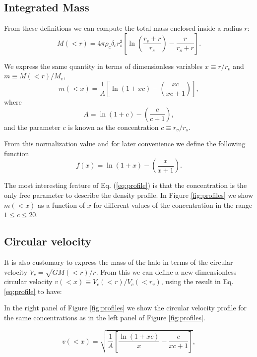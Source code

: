 \documentclass{emulateapj}
\begin{document}
\subsection{Integrated Mass}
From these definitions we can compute the total mass enclosed inside a
radius $r$:
\begin{equation}
M(<r) = 4\pi\rho_c\delta_c  r_s^3\left[\ln \left
  (\frac{r_s+r}{r_s}\right) - \frac{r}{r_s+r}\right].
\end{equation}

We express the same quantity in terms of dimensionless
variables $x\equiv r/r_v$ and $m\equiv M(<r)/M_v$,
%
\begin{equation}
m(<x) =
\frac{1}{A}\left[\ln\left(1+xc\right)-\left(\frac{xc}{xc+1}\right)\right],
\label{eq:profile}
\end{equation}
%
where
%
\begin{equation}
A=\ln\left(1+c\right)-\left(\frac{c}{c+1}\right),
\end{equation}
%
and the parameter $c$ is known as the concentration $c\equiv r_v/r_s$.

From this normalization value and for later convenience we define the
following function
%
\begin{equation}
f(x) = \ln\left(1+x\right)-\left(\frac{x}{x+1}\right).
\label{eq:f_NFW}
\end{equation}
%

The most interesting feature of Eq. (\ref{eq:profile}) is that the
concentration is the only free parameter to describe the density
profile. In Figure \ref{fig:profiles} we show $m(<x)$ as
a function of $x$ for different values of the concentration in the range
$1\leq c \leq 20$.


\subsection{Circular velocity}

It is also customary to express the mass of the halo in terms of the
circular velocity $V_{c}=\sqrt{GM(<r)/r}$. From this we can
define a new dimensionless circular velocity $v(<x)\equiv
V_{c}(<r)/V_{c}(<r_v)$, using the result in Eq. \ref{eq:profile}
to have:


In the right panel of Figure \ref{fig:profiles} we show the circular
velocity profile for the same concentrations as in the left panel of
Figure \ref{fig:profiles}.

\begin{equation}
v(<x)=\sqrt{\frac{1}{A}\left[\frac{\ln\left(1+xc\right)}{x}-\frac{c}{xc+1}\right]},
\end{equation}
\end{document}
